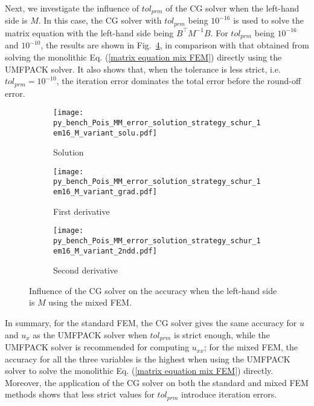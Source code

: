 \documentclass[review,3p]{elsarticle}
\begin{document}
Next, we investigate the influence of $tol_{prm}$ of the CG solver when the left-hand side is $M$. In this case, the CG solver with $tol_{prm}$ being $10^{-16}$ is used to solve the matrix equation with the left-hand side being $B^{\top}M^{-1}B$. For $tol_{prm}$ being $10^{-16}$ and $10^{-10}$, the results are shown in Fig.~\ref{py_bench_Pois_MM_error_solution_strategy_schur_1em16_M_variant}, in comparison with that obtained from solving the monolithic Eq. (\ref{matrix equation mix FEM}) directly using the UMFPACK solver.
It also shows that, when the tolerance is less strict, i.e. $tol_{prm}=10^{-10}$, the iteration error dominates the total error before the round-off error.

\begin{figure}[!ht]
    \begin{subfigure}{5.5cm}
        \texttt{[image: py\_bench\_Pois\_MM\_error\_solution\_strategy\_schur\_1em16\_M\_variant\_solu.pdf]}
        \caption{Solution}
        \label{py_bench_Pois_MM_error_solution_strategy_schur_1em16_M_variant_solu}
    \end{subfigure}
    \hspace{-0.2cm}
    \begin{subfigure}{5.5cm}
        \texttt{[image: py\_bench\_Pois\_MM\_error\_solution\_strategy\_schur\_1em16\_M\_variant\_grad.pdf]}
        \caption{First derivative}
        \label{py_bench_Pois_MM_error_solution_strategy_schur_1em16_M_variant_grad}
    \end{subfigure}
    \hspace{-0.2cm}
    \begin{subfigure}{5.5cm}
        \texttt{[image: py\_bench\_Pois\_MM\_error\_solution\_strategy\_schur\_1em16\_M\_variant\_2ndd.pdf]}
        \caption{Second derivative}
        \label{py_bench_Pois_MM_error_solution_strategy_schur_1em16_M_variant_2ndd}
    \end{subfigure}
\caption{Influence of the CG solver on the accuracy when the left-hand side is $M$ using the mixed FEM.}		%
\label{py_bench_Pois_MM_error_solution_strategy_schur_1em16_M_variant}
\end{figure}

In summary, for the standard FEM, the CG solver gives the same accuracy for $u$ and $u_{x}$ as the UMFPACK solver when $tol_{prm}$ is strict enough, while the UMFPACK solver is recommended for computing $u_{xx}$; for the mixed FEM, the accuracy for all the three variables is the highest when using the UMFPACK solver to solve the monolithic Eq. (\ref{matrix equation mix FEM}) directly. Moreover, the application of the CG solver on both the standard and mixed FEM methods shows that less strict values for $tol_{prm}$ introduce iteration errors.
\end{document}

